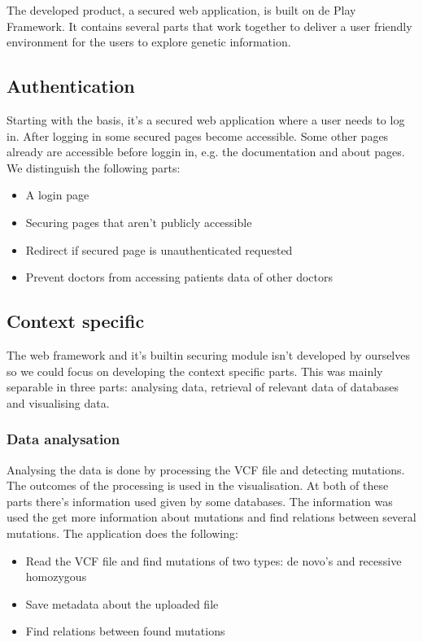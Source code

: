 The developed product, a secured web application, is built on de Play Framework. It contains several parts that work together to deliver a user friendly environment for the users to explore genetic information.

\subsection{Authentication}

Starting with the basis, it's a secured web application where a user needs to log in. After logging in some secured pages become accessible. Some other pages already are accessible before loggin in, e.g. the documentation and about pages. We distinguish the following parts:

\begin{itemize}
  \item A login page
  \item Securing pages that aren't publicly accessible
  \item Redirect if secured page is unauthenticated requested
  \item Prevent doctors from accessing patients data of other doctors
\end{itemize}

\subsection{Context specific}

The web framework and it's builtin securing module isn't developed by ourselves so we could focus on developing the context specific parts. This was mainly separable in three parts: analysing data, retrieval of relevant data of databases and visualising data.

\subsubsection{Data analysation}

Analysing the data is done by processing the VCF file and detecting mutations. The outcomes of the processing is used in the visualisation. At both of these parts there's information used given by some databases. The information was used the get more information about mutations and find relations between several mutations. The application does the following:

\begin{itemize}
  \item Read the VCF file and find mutations of two types: de novo's and recessive homozygous
  \item Save metadata about the uploaded file
  \item Find relations between found mutations
\end{itemize}

